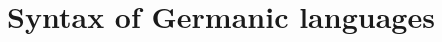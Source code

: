 





\newtoggle{klimaheading}\toggletrue{klimaheading}


\title{Syntax of Germanic languages}




%
%
%
%
%
%
%
%
%
%
%

 
\hypersetup{bookmarksopen=false}

\huberlintitlepage






%








%
%
%

